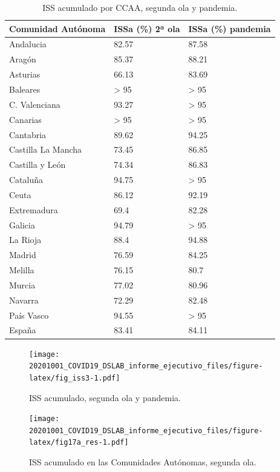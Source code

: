 \documentclass[
  11pt,
]{article}
\begin{document}
\begin{table}[!h]

\caption{\label{tab:tabla}ISS acumulado por CCAA, segunda ola y pandemia.}
\centering
\fontsize{9}{11}\selectfont
\begin{tabular}[t]{l|l|l}
\hline
Comunidad Autónoma & ISSa (\%) 2ª ola & ISSa (\%) pandemia\\
\hline
Andalucia & 82.57 & 87.58\\
\hline
Aragón & 85.37 & 88.21\\
\hline
Asturias & 66.13 & 83.69\\
\hline
Baleares & > 95 & > 95\\
\hline
C. Valenciana & 93.27 & > 95\\
\hline
Canarias & > 95 & > 95\\
\hline
Cantabria & 89.62 & 94.25\\
\hline
Castilla La Mancha & 73.45 & 86.85\\
\hline
Castilla y León & 74.34 & 86.83\\
\hline
Cataluña & 94.75 & > 95\\
\hline
Ceuta & 86.12 & 92.19\\
\hline
Extremadura & 69.4 & 82.28\\
\hline
Galicia & 94.79 & > 95\\
\hline
La Rioja & 88.4 & 94.88\\
\hline
Madrid & 76.59 & 84.25\\
\hline
Melilla & 76.15 & 80.7\\
\hline
Murcia & 77.02 & 80.96\\
\hline
Navarra & 72.29 & 82.48\\
\hline
País Vasco & 94.55 & > 95\\
\hline
España & 83.41 & 84.11\\
\hline
\end{tabular}
\end{table}

\begin{figure}
\centering
\texttt{[image: 20201001\_COVID19\_DSLAB\_informe\_ejecutivo\_files/figure-latex/fig\_iss3-1.pdf]}
\caption{\label{fig:fig_iss3} ISS acumulado, segunda ola y pandemia.}
\end{figure}

\vspace{0.2cm}

\begin{figure}
\centering
\texttt{[image: 20201001\_COVID19\_DSLAB\_informe\_ejecutivo\_files/figure-latex/fig17a\_res-1.pdf]}
\caption{\label{fig:fig17a_res} ISS acumulado en las Comunidades
Autónomas, segunda ola.}
\end{figure}
\end{document}
